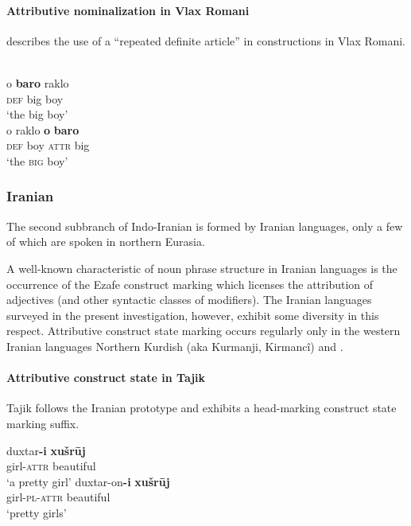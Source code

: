 \paragraph*{Attributive nominalization in Vlax Romani}
\citet{hancock1995} describes the use of a “repeated definite article” in  constructions in Vlax Romani. 
\begin{exe}
\begin{xlist}
\\
\gll	o \textbf{baro} raklo\\
	\textsc{def}	big	boy\\
\glt ‘the big boy’
\\
\gll	o raklo \textbf{o} \textbf{baro}\\
	\textsc{def}	{boy}	\textsc{attr} big\\
\glt	‘the \textsc{big} boy’
\end{xlist}
\end{exe}

\subsubsection{Iranian}
\label{iranian synchr}
The second subbranch of Indo-Iranian is formed by Iranian languages, only a few of which are spoken in northern Eurasia.

A well-known characteristic of noun phrase structure in Iranian languages is the occurrence of the Ezafe construct marking which licenses the attribution of adjectives (and other syntactic classes of modifiers). The Iranian languages surveyed in the present investigation, however, exhibit some diversity in this respect. Attributive construct state marking occurs regularly only in the western Iranian languages Northern Kurdish (aka Kurmanji, Kirmancî) and .

\paragraph*{Attributive construct state in Tajik}
Tajik follows the Iranian prototype and exhibits a head-marking construct state marking suffix.
\begin{exe}
\begin{xlist}
\ex
\gll	duxtar\textbf{-i} \textbf{xušrūj}\\
	girl-\textsc{attr} beautiful\\
\glt	‘a pretty girl’
\ex
\gll	duxtar-on\textbf{-i} \textbf{xušrūj}\\
	girl-\textsc{pl}-\textsc{attr} beautiful\\
\glt	‘pretty girls’
\end{xlist}
\end{exe}


